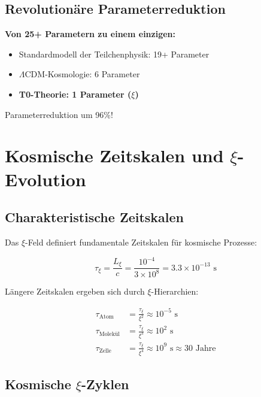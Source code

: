 \documentclass[12pt,a4paper]{article}
\newcommand{\xipar}{\xi}
\newcommand{\Lxi}{L_\xi}
\begin{document}
	\subsection{Revolutionäre Parameterreduktion}
	
	\begin{revolutionary}
		\textbf{Von 25+ Parametern zu einem einzigen:}
		
		\begin{itemize}
			\item Standardmodell der Teilchenphysik: 19+ Parameter
			\item $\Lambda$CDM-Kosmologie: 6 Parameter
			\item \textbf{T0-Theorie: 1 Parameter ($\xipar$)}
		\end{itemize}
		
		Parameterreduktion um 96\%!
	\end{revolutionary}
	
	\section{Kosmische Zeitskalen und $\xi$-Evolution}
	
	\subsection{Charakteristische Zeitskalen}
	
	Das $\xi$-Feld definiert fundamentale Zeitskalen für kosmische Prozesse:
	
	\begin{equation}
		\tau_\xi = \frac{\Lxi}{c} = \frac{10^{-4}}{3 \times 10^8} = 3.3 \times 10^{-13} \text{ s}
	\end{equation}
	
	Längere Zeitskalen ergeben sich durch $\xi$-Hierarchien:
	
	\begin{align}
		\tau_{\text{Atom}} &= \frac{\tau_\xi}{\xipar^2} \approx 10^{-5} \text{ s} \\
		\tau_{\text{Molekül}} &= \frac{\tau_\xi}{\xipar^3} \approx 10^2 \text{ s} \\
		\tau_{\text{Zelle}} &= \frac{\tau_\xi}{\xipar^4} \approx 10^9 \text{ s} \approx 30 \text{ Jahre}
	\end{align}
	
	\subsection{Kosmische $\xi$-Zyklen}
	
\end{document}

